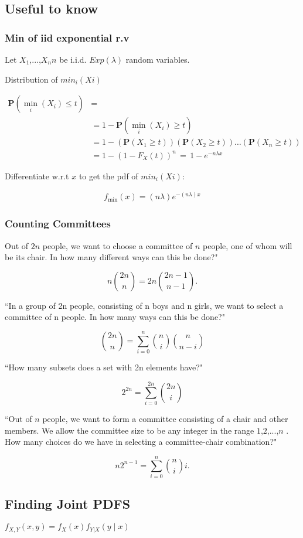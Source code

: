 \subsection{Useful to know}

\subsubsection{Min of iid exponential r.v}
Let  $X_1$,...,$X_nn$  be i.i.d. $Exp(\lambda)$ random variables.

Distribution of $min_i(Xi)$ 

\begin{align*}
   \mathbf{P}(\min _ i (X_ i)\leq t) &=\\
&=1-\mathbf{P}(\min _ i (X_ i)\geq t)\\
&=1-(\mathbf{P}(X_1\geq t))(\mathbf{P}(X_2\geq t))\ldots (\mathbf{P}(X_ n\geq t))\\
&=1-(1-F_ X(t))^ n \, =\, 1-e^{-n\lambda x}
\end{align*}

Differentiate w.r.t $x$ to get the pdf of $min_i(Xi)$:

\begin{align*}
f_{\text {min}}(x)= (n\lambda ) e^{-(n\lambda ) x}
\end{align*}


\subsubsection{Counting Committees}

Out of  $2n$  people, we want to choose a committee of $n$ people, one of whom will be its chair. In how many different ways can this be done?" 

$$n\binom {2n}{n}=2n\binom {2n-1}{n-1}.$$

“In a group of  2n  people, consisting of  n  boys and  n  girls, we want to select a committee of  n  people. In how many ways can this be done?"

$$\binom {2n}{n}=\sum _{i=0}^ n \binom {n}{i}\binom {n}{n-i}$$

“How many subsets does a set with  2n  elements have?" 

$$2^{2n}=\sum _{i=0}^{2n}\binom {2n}{i}$$

“Out of  $n$  people, we want to form a committee consisting of a chair and other members. We allow the committee size to be any integer in the range $1$,$2$,...,$n$ . How many choices do we have in selecting a committee-chair combination?"

$$n2^{n-1}=\sum _{i=0}^ n \binom {n}{i}i.$$

\subsection{Finding Joint PDFS}

$f_{X,Y}(x,y)=f_ X(x)f_{Y|X}(y\mid x)$